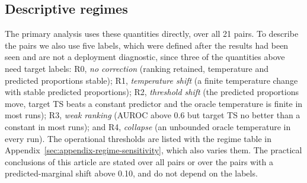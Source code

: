 \subsection{Descriptive regimes}
\label{sec:background-regimes}

The primary analysis uses these quantities directly, over all 21 pairs. To describe the pairs we also use five labels,
which were defined after the results had been seen and are not a deployment diagnostic, since three of the quantities
above need target labels:
R0, \emph{no correction} (ranking retained, temperature and predicted proportions stable);
R1, \emph{temperature shift} (a finite temperature change with stable predicted proportions);
R2, \emph{threshold shift} (the predicted proportions move, target TS beats a constant predictor and the oracle
temperature is finite in most runs);
R3, \emph{weak ranking} (AUROC above 0.6 but target TS no better than a constant in most runs); and
R4, \emph{collapse} (an unbounded oracle temperature in every run). The operational thresholds are listed with the
regime table in Appendix~\ref{sec:appendix-regime-sensitivity}, which also varies them. The practical conclusions of
this article are stated over all pairs or over the pairs with a predicted-marginal shift above 0.10, and do not depend
on the labels.
